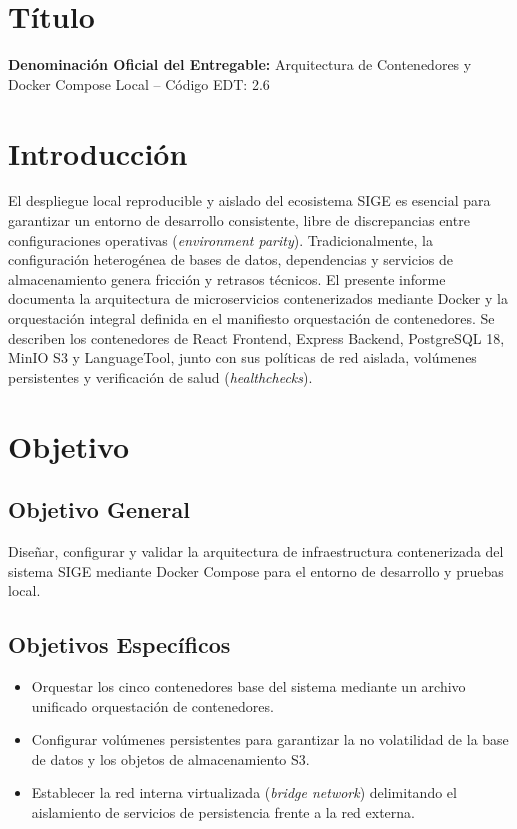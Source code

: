\documentclass[12pt,a4paper]{article}
\begin{document}
\section{Título}
\textbf{Denominación Oficial del Entregable:} Arquitectura de Contenedores y Docker Compose Local -- Código EDT: 2.6

\section{Introducción}
El despliegue local reproducible y aislado del ecosistema SIGE es esencial para garantizar un entorno de desarrollo consistente, libre de discrepancias entre configuraciones operativas (\textit{environment parity}). Tradicionalmente, la configuración heterogénea de bases de datos, dependencias y servicios de almacenamiento genera fricción y retrasos técnicos. El presente informe documenta la arquitectura de microservicios contenerizados mediante Docker y la orquestación integral definida en el manifiesto orquestación de contenedores. Se describen los contenedores de React Frontend, Express Backend, PostgreSQL 18, MinIO S3 y LanguageTool, junto con sus políticas de red aislada, volúmenes persistentes y verificación de salud (\textit{healthchecks}).

\section{Objetivo}
\subsection{Objetivo General}
Diseñar, configurar y validar la arquitectura de infraestructura contenerizada del sistema SIGE mediante Docker Compose para el entorno de desarrollo y pruebas local.
\subsection{Objetivos Específicos}
\begin{itemize}[leftmargin=1.5em, itemsep=2pt]
    \item Orquestar los cinco contenedores base del sistema mediante un archivo unificado orquestación de contenedores.
    \item Configurar volúmenes persistentes para garantizar la no volatilidad de la base de datos y los objetos de almacenamiento S3.
    \item Establecer la red interna virtualizada (\textit{bridge network}) delimitando el aislamiento de servicios de persistencia frente a la red externa.
\end{itemize}
\end{document}
